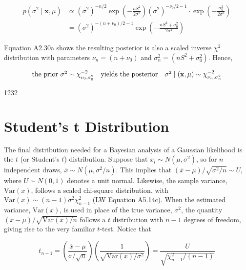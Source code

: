 \documentclass{article}
\begin{document}
\begin{equation}
\begin{align*}p(\sigma^{2}\mid\mathbf{x},\mu)&\propto(\sigma^{2})^{-n/2}\exp\left(-\frac{nS^{2}}{2\sigma^{2}}\right)(\sigma^{2})^{-\nu_{0}/2-1}\cdot\exp\left(-\frac{\sigma_{0}^{2}}{2\sigma^{2}}\right)\\&=(\sigma^{2})^{-(n+\nu_{0})/2-1}\exp\left(-\frac{nS^{2}+\sigma_{0}^{2}}{2\sigma^{2}}\right)\end{align*}
\end{equation}

Equation A2.30a shows the resulting posterior is also a scaled inverse  $ \chi^2 $ distribution with parameters  $ \nu_n = (n + \nu_0) $ and  $ \sigma_n^2 = (nS^2 + \sigma_0^2) $. Hence,

\begin{equation}
\begin{array}{r l}{\mathrm{t h e~p r i o r~}\sigma^{2}\sim\chi_{\nu_{0},\sigma_{0}^{2}}^{-2}}&{{}\mathrm{y i e l d s~t h e~p o s t e r i o r}\quad\sigma^{2}\mid(\mathbf{x},\mu)\sim\chi_{\nu_{n},\sigma_{n}^{2}}^{-2}}\end{array}
\end{equation}

1232

\section{Student's t Distribution}
The final distribution needed for a Bayesian analysis of a Gaussian likelihood is the $t$ (or Student's $t$) distribution. Suppose that $x_i \sim N(\mu, \sigma^2)$, so for $n$ independent draws, $\overline{x} \sim N(\mu, \sigma^2/n)$. This implies that $(\overline{x} - \mu)/\sqrt{\sigma^2/n} \sim U$, where $U \sim N(0,1)$ denotes a unit normal. Likewise, the sample variance, $\text{Var}(x)$, follows a scaled chi-square distribution, with $\text{Var}(x) \sim (n-1)\sigma^2\chi_{n-1}^2$ (LW Equation A5.14c). When the estimated variance, $\text{Var}(x)$, is used in place of the true variance, $\sigma^2$, the quantity $(\overline{x} - \mu)/\sqrt{\text{Var}(x)/n}$ follows a $t$ distribution with $n - 1$ degrees of freedom, giving rise to the very familiar $t$-test. Notice that

\begin{equation}
t_{n-1}=\left(\frac{\overline{x}-\mu}{\sigma/\sqrt{n}}\right)\left(\frac{1}{\sqrt{\mathrm{Var}(x)/\sigma^{2}}}\right)=\frac{U}{\sqrt{\chi_{n-1}^{2}/(n-1)}}
\end{equation}
\end{document}
